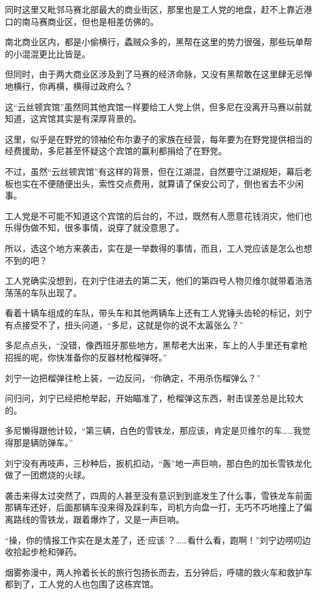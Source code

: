 同时这里又毗邻马赛北部最大的商业街区，那里也是工人党的地盘，赶不上靠近港口的南马赛商业区，但也是相差仿佛的。

南北商业区内，都是小偷横行，蟊贼众多的，黑帮在这里的势力很强，那些玩单帮的小混混更比比皆是。

但同时，由于两大商业区涉及到了马赛的经济命脉，又没有黑帮敢在这里肆无忌惮地横行，你再横，横得过政府么？

这“云丝顿宾馆”虽然同其他宾馆一样要给工人党上供，但多尼在没离开马赛以前就知道，这宾馆其实是有深厚背景的。

这里，似乎是在野党的领袖伦布尔妻子的家族在经营，每年要为在野党提供相当的经费援助，多尼甚至怀疑这个宾馆的赢利都捐给了在野党。

不过，虽然“云丝顿宾馆”有这样的背景，但在江湖混，自然要守江湖规矩，幕后老板也实在不便随便出头，索性交点费用，就算请了保安公司了，倒也省去不少闲事。

工人党是不可能不知道这个宾馆的后台的，不过，既然有人愿意花钱消灾，他们也乐得伪做不知，很多事情，说穿了就没意思了。

所以，选这个地方来袭击，实在是一举数得的事情，而且，工人党应该是怎么也想不到的吧？

工人党确实没想到，在刘宁住进去的第二天，他们的第四号人物贝维尔就带着浩浩荡荡的车队出现了。

看着十辆车组成的车队，带头车和其他两辆车上还有工人党锤头齿轮的标记，刘宁有点接受不了，扭头问道，“多尼，这就是你的说不太嚣张么？”

多尼点点头，“没错，像西班牙那些地方，黑帮老大出来，车上的人手里还有拿枪招摇的呢，你快准备你的反器材枪榴弹呀。”

刘宁一边把榴弹往枪上装，一边反问，“你确定，不用杀伤榴弹么？”

问归问，刘宁已经把枪举起，开始瞄准了，枪榴弹这东西，射击误差总是比较大的。

多尼懒得跟他计较，“第三辆，白色的雪铁龙，那应该，肯定是贝维尔的车……我觉得那是辆防弹车。”

刘宁没有再吱声，三秒种后，扳机扣动，“轰”地一声巨响，那白色的加长雪铁龙化做了一团燃烧的火球。

袭击来得太过突然了，四周的人甚至没有意识到到底发生了什么事，雪铁龙车前面那辆车还好，后面那辆车没来得及踩刹车，司机方向盘一打，无巧不巧地撞上了偏离路线的雪铁龙，跟着爆炸了，又是一声巨响。

“操，你的情报工作实在是太差了，还‘应该’？……看什么看，跑啊！”刘宁边唠叨边收拾起步枪和弹药。

烟雾弥漫中，两人拎着长长的旅行包扬长而去，五分钟后，呼啸的救火车和救护车都到了，工人党的人也包围了这栋宾馆。

